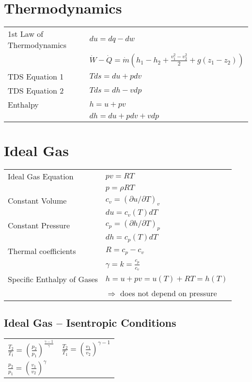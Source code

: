 \section*{Thermodynamics}
\begin{tabular}{ m{5cm} l}
    1st Law of Thermodynamics & $du = dq - dw$  \\
     & $\dot{W} - \dot{Q} = \dot{m} \left( h_1 - h_2 + \frac{v_1^2 - v_2^2}{2} + g \left(z_1 - z_2 \right) \right)$ \\
    TDS Equation 1 & $Tds = du + pdv$ \\
    TDS Equation 2 & $Tds = dh - vdp$ \\
    Enthalpy & $h = u + pv$ \\
     & $d h  = du + p dv + v dp$ \\
\end{tabular}

\section*{Ideal Gas}
\begin{tabular}{ m{5cm} l}
    Ideal Gas Equation & $pv = RT$ \\
     & $p = \rho R T$ \\
    Constant Volume & $c_v = (\partial u / \partial T)_v$ \\
     & $du = c_v (T) dT$ \\
     Constant Pressure & $c_p = (\partial h / \partial T)_p$ \\
     & $dh = c_p (T) dT$ \\
     Thermal coefficients & $R = c_p - c_v$ \\
      & $\gamma = k = \frac{c_p}{c_v}$ \\
      Specific Enthalpy of Gases & $h = u + pv = u(T) + RT = h(T)$ \\
       & $\Rightarrow$ does not depend on pressure
\end{tabular}

\subsection*{Ideal Gas – Isentropic Conditions}
\begin{tabular}{ m{5cm} l}
    $\frac{T_2}{T_1} = \left( \frac{p_2}{p_1} \right)^{ \frac{\gamma - 1}{\gamma}} $ & $\frac{T_2}{T_1} = \left( \frac{v_1}{v_2} \right)^{ \gamma -1 } $ \\
    $\frac{p_2}{p_1} = \left( \frac{v_1}{v_2} \right)^{ \gamma } $ & \\
\end{tabular}\\

